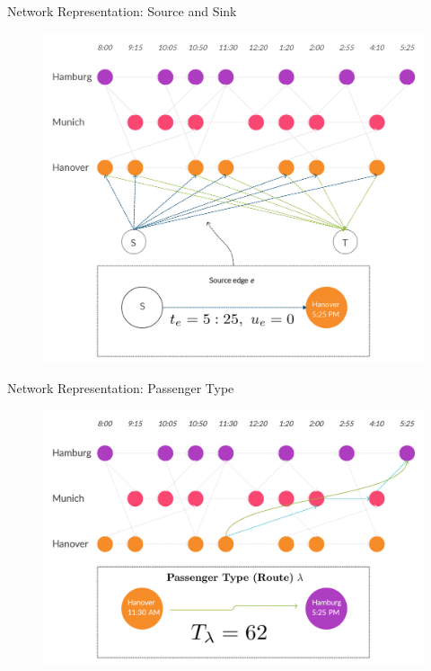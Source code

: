 \documentclass[handout]{beamer}
\begin{document}
\begin{frame}{Network Representation: Source and Sink}
\begin{figure}
    \centering
    \includegraphics[scale=0.10]{Source_Sink_Edges.jpg}
\end{figure}
\end{frame}

\begin{frame}{Network Representation: Passenger Type}
\begin{figure}
    \centering
    \includegraphics[scale=0.13]{Passenger_Path_Example.jpg}
\end{figure}
\end{frame}
\end{document}
